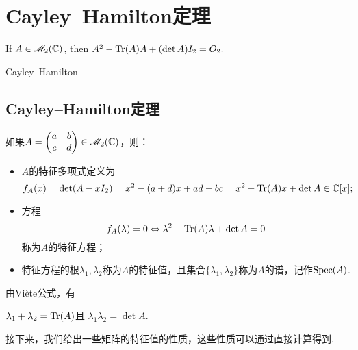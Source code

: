 \chapter{Cayley--Hamilton定理}
\begin{proverb}
  { \kaishu
      If $A\in\mathscr M_2(\mathbb C)$, then $A^2-\operatorname{Tr}(A)A + (\det A)I_2=O_2.$
  }

\hfill Cayley--Hamilton
\end{proverb}

\section{Cayley--Hamilton定理}

如果$A=\begin{pmatrix}
  a & b \\
  c & d
\end{pmatrix}\in\mathscr M_2(\mathbb C)$，则：
\begin{itemize}
  \item $A$的{\kaishu 特征多项式}定义为
      \[
        f_A(x) = \det (A - xI_2) = x^2 - (a+d)x + ad -bc = x^2 - \operatorname{Tr}(A)x + \det A \in \mathbb C[x];
      \]
  \item 方程
      \[
        f_A(\lambda) = 0 \Leftrightarrow
        \lambda^2 - \operatorname{Tr}(A)\lambda + \det A = 0
      \]
      称为$A$的{\kaishu 特征方程}；
  \item 特征方程的根$\lambda_1,\lambda_2$称为$A$的{\kaishu 特征值}，且集合$\{\lambda_1,\lambda_2\}$称为$A$的{\kaishu 谱}，记作$\operatorname{Spec}(A)$.
\end{itemize}

由Vi\`ete公式，有
\begin{mybox}
  \hfil
    $\lambda_1 + \lambda_2 =\operatorname{Tr}(A)$\quad 且
    \quad $\lambda_1\lambda_2 = \det A$.
  \hfill
\end{mybox}

接下来，我们给出一些矩阵的特征值的性质，这些性质可以通过直接计算得到.

